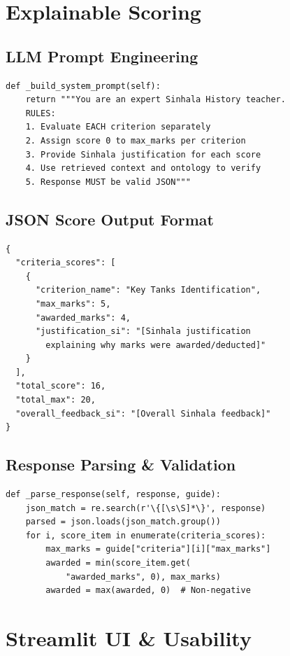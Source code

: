 \documentclass[12pt,a4paper]{article}
\begin{document}
\section{Explainable Scoring}

\subsection{LLM Prompt Engineering}
\begin{lstlisting}[caption={Scoring system prompt (scoring\_agent.py)}]
def _build_system_prompt(self):
    return """You are an expert Sinhala History teacher.
    RULES:
    1. Evaluate EACH criterion separately
    2. Assign score 0 to max_marks per criterion
    3. Provide Sinhala justification for each score
    4. Use retrieved context and ontology to verify
    5. Response MUST be valid JSON"""
\end{lstlisting}

\subsection{JSON Score Output Format}
\begin{lstlisting}[language={}]
{
  "criteria_scores": [
    {
      "criterion_name": "Key Tanks Identification",
      "max_marks": 5,
      "awarded_marks": 4,
      "justification_si": "[Sinhala justification
        explaining why marks were awarded/deducted]"
    }
  ],
  "total_score": 16,
  "total_max": 20,
  "overall_feedback_si": "[Overall Sinhala feedback]"
}
\end{lstlisting}

\subsection{Response Parsing \& Validation}
\begin{lstlisting}[caption={Score parsing with validation}]
def _parse_response(self, response, guide):
    json_match = re.search(r'\{[\s\S]*\}', response)
    parsed = json.loads(json_match.group())
    for i, score_item in enumerate(criteria_scores):
        max_marks = guide["criteria"][i]["max_marks"]
        awarded = min(score_item.get(
            "awarded_marks", 0), max_marks)
        awarded = max(awarded, 0)  # Non-negative
\end{lstlisting}

\section{Streamlit UI \& Usability}
\end{document}
